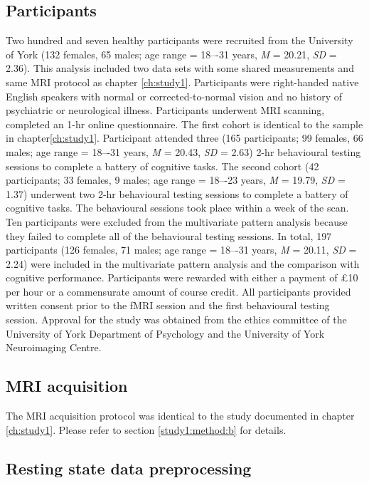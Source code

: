 \subsection{Participants}
\label{study3:method:a}
Two hundred and seven healthy participants were recruited from the University of York (132 females, 65 males; age range = 18–-31 years, \textit{M} = 20.21, \textit{SD} = 2.36).
This analysis included two data sets with some shared measurements and same MRI protocol as chapter \ref{ch:study1}.
Participants were right-handed native English speakers with normal or corrected-to-normal vision and no history of psychiatric or neurological illness. Participants underwent MRI scanning, completed an 1-hr online questionnaire. The first cohort is identical to the sample in chapter\ref{ch:study1}. Participant attended three
(165 participants; 99 females, 66 males; age range = 18–-31 years, \textit{M} = 20.43, \textit{SD} = 2.63) 2-hr behavioural testing sessions to complete a battery of cognitive tasks.
The second cohort (42 participants; 33 females, 9 males; age range = 18–-23 years, \textit{M} = 19.79, \textit{SD} = 1.37) underwent two 2-hr behavioural testing sessions to complete a battery of cognitive tasks. The behavioural sessions took place within a week of the scan. Ten participants were excluded from the multivariate pattern analysis because they failed to complete all of the behavioural testing sessions. In total, 197 participants (126 females, 71 males; age range = 18–-31 years, \textit{M} = 20.11, \textit{SD} = 2.24) were included in the multivariate pattern analysis and the comparison with cognitive performance. Participants were rewarded with either a payment of \pounds 10 per hour or a commensurate amount of course credit. All participants provided written consent prior to the fMRI session and the first behavioural testing session. Approval for the study was obtained from the ethics committee of the University of York Department of Psychology and the University of York Neuroimaging Centre.

\subsection{MRI acquisition}
\label{study3:method:b}
The MRI acquisition protocol was identical to the study documented in chapter \ref{ch:study1}. Please refer to section \ref{study1:method:b} for details.

\subsection{Resting state data preprocessing}
\label{study3:method:c}

